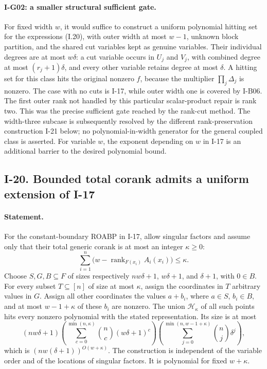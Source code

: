 \paragraph{I-G02: a smaller structural sufficient gate.}
\label{I-G02}
For fixed width $w$, it would suffice to construct a uniform polynomial
hitting set for the expressions (I.20), with outer width at most
$w-1$, unknown block partition, and the shared cut variables kept
as genuine variables.  Their individual degrees are at most
$w\delta$: a cut variable occurs in $U_j$ and $V_j$, with combined
degree at most $(r_j+1)\delta$, and every other variable retains
degree at most $\delta$.  A hitting set for this class hits the
original nonzero $f$, because the multiplier $\prod_j\Delta_j$
is nonzero.  The case with no cuts is I-17, while outer width one
is covered by I-B06.  The first outer rank not handled by this
particular scalar-product repair is rank two.  This was the precise
sufficient gate reached by the rank-cut method.  The width-three
subcase is subsequently resolved by the different rank-preservation
construction I-21 below; no polynomial-in-width generator for
the general coupled class is asserted.  For variable
$w$, the exponent depending on $w$ in I-17 is an additional barrier
to the desired polynomial bound.

\subsection{I-20. Bounded total corank admits a uniform extension of I-17}
\label{I-20}

\paragraph{Statement.}
For the constant-boundary ROABP in I-17, allow singular factors and
assume only that their total generic corank is at most an integer
$\kappa\ge0$:
\[
 \sum_{i=1}^n\bigl(w-\operatorname{rank}_{F(x_i)}A_i(x_i)\bigr)
 \le\kappa.
\]
Choose $S,G,B\subseteq F$ of sizes respectively
$nw\delta+1$, $w\delta+1$, and $\delta+1$, with $0\in B$.
For every subset $T\subseteq[n]$ of size at most $\kappa$, assign
the coordinates in $T$ arbitrary values in $G$.  Assign all other
coordinates the values $a+b_i$, where $a\in S$, $b_i\in B$, and
at most $w-1+\kappa$ of these $b_i$ are nonzero.  The union
$\mathcal H_\kappa$ of all such points hits every nonzero polynomial
with the stated representation.  Its size is at most
\[
 (nw\delta+1)
 \left(\sum_{c=0}^{\min(n,\kappa)}\binom nc(w\delta+1)^c\right)
 \left(\sum_{j=0}^{\min(n,w-1+\kappa)}\binom nj\delta^j\right),
\tag{I.21}\label{eq:I-corank-hit}
\]
which is $(nw(\delta+1))^{O(w+\kappa)}$.
The construction is independent of the variable order and of the
locations of singular factors.  It is polynomial for fixed
$w+\kappa$.


